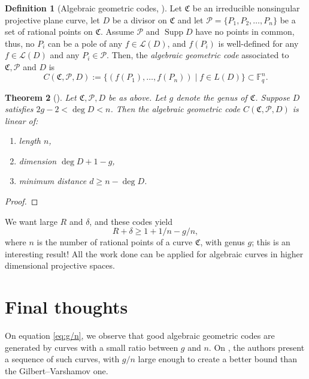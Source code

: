 \documentclass[11pt, oneside]{amsart}
\newtheorem{thm}{Theorem}[section]
\theoremstyle{definition}
\newtheorem{defn}[thm]{Definition}
\theoremstyle{remark}
\numberwithin{equation}{section}
\DeclareMathOperator{\Supp}{Supp}
\begin{document}
\begin{defn}[Algebraic geometric codes, \cite{LS87, Wal00}] %
	Let $\mathfrak C$ be an irreducible nonsingular%
	projective plane curve, let $D$ be a divisor on $\mathfrak C$ and let $\mathcal P = \{P_1, P_2, \dots, P_n\}$ be a set of rational points on $\mathfrak C$.
	Assume $\mathcal P$ and $\Supp D$ have no points in common, thus, no $P_i$ can be a pole of any $f \in \mathcal L(D)$, and $f(P_i)$ is well-defined for any $f \in \mathcal L(D)$ and any $P_i \in \mathcal P$.
	Then, the \emph{algebraic geometric code} associated to $\mathfrak C, \mathcal P$ and $D$ is
	\begin{equation}
		C(\mathfrak C, \mathcal P, D) := \{(f(P_1), \dots, f(P_n)) \mid f \in L(D)\} \subset \mathbb{F}_q^n.
	\end{equation}
\end{defn}

\begin{thm}[\cite{Wal00}]
	Let $\mathfrak C, \mathcal P, D$ be as above. Let $g$ denote the genus of $\mathfrak C$. Suppose $D$ satisfies $2g - 2 < \deg D < n$. Then the algebraic geometric code $C(\mathfrak C, \mathcal P, D)$ is linear of:
	\begin{enumerate}[label = \textbullet, itemsep = 0pt]
		\item length $n$,
		\item dimension $\deg D + 1 - g$,
		\item minimum distance $d \ge n - \deg D$.
	\end{enumerate}
\end{thm}

\begin{proof}
\end{proof}

We want large $R$ and $\delta$, and these codes yield 
	\begin{equation}
		\label{eq:g/n} R + \delta \ge 1 + 1/n - g/n,
	\end{equation}
where $n$ is the number of rational points of a curve $\mathfrak C$, with genus $g$; this is an interesting result!
All the work done can be applied for algebraic curves in higher dimensional projective spaces.

\section{Final thoughts}\label{s:tvz}

On equation \eqref{eq:g/n}, we observe that good algebraic geometric codes are generated by curves with a small ratio between $g$ and $n$.
On \cite{TVZ82}, the authors present a sequence of such curves, with $g/n$ large enough to create a better bound than the Gilbert--Varshamov one.

\printbibliography
\end{document}
